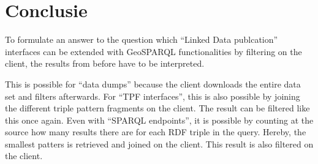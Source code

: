 \documentclass[twocolumn]{phdsymp} %
\begin{document}
\section{Conclusie}
To formulate an answer to the question which ``Linked Data publcation'' interfaces can be extended with GeoSPARQL functionalities by filtering on the client, the results from before have to be interpreted.

This is possible for ``data dumps'' because the client downloads the entire data set and filters afterwards. For ``TPF interfaces'', this is also possible by joining the different triple pattern fragments on the client. The result can be filtered like this once again. Even with ``SPARQL endpoints'', it is possible by counting at the source how many results there are for each RDF triple in the query. Hereby, the smallest patters is retrieved and joined on the client. This result is also filtered on the client.



\end{document}
